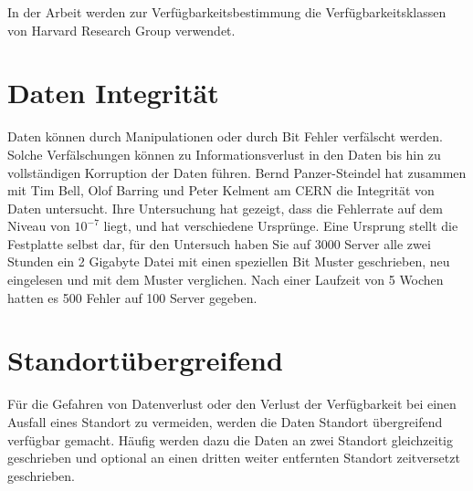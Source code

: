 In der Arbeit werden zur Verfügbarkeitsbestimmung die Verfügbarkeitsklassen von Harvard Research Group verwendet.

\section{Daten Integrität}
Daten können durch Manipulationen oder durch Bit Fehler verfälscht werden. Solche Verfälschungen können zu Informationsverlust in den Daten bis hin zu vollständigen Korruption der Daten führen. 
Bernd Panzer-Steindel hat zusammen mit Tim Bell, Olof Barring und Peter Kelment am CERN die Integrität von Daten untersucht. Ihre Untersuchung hat gezeigt, dass die Fehlerrate auf dem Niveau von $10^{-7}$ liegt, und hat verschiedene Ursprünge. Eine Ursprung stellt die Festplatte selbst dar, für den Untersuch haben Sie auf 3000 Server alle zwei Stunden ein 2 Gigabyte Datei mit einen speziellen Bit Muster geschrieben, neu eingelesen und mit dem Muster verglichen. Nach einer Laufzeit von 5 Wochen hatten es 500 Fehler auf 100 Server gegeben. \cite{Panzer-steindel2007}

\section{Standortübergreifend}
Für die Gefahren von Datenverlust oder den Verlust der Verfügbarkeit bei einen Ausfall eines Standort zu vermeiden, werden die Daten Standort übergreifend verfügbar gemacht. Häufig werden dazu die Daten an zwei Standort gleichzeitig geschrieben und optional an einen dritten weiter entfernten Standort zeitversetzt geschrieben. 